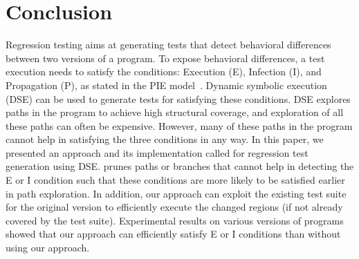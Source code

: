 \section{Conclusion}
\label{sec:conclusion}
Regression testing aims at generating tests that detect behavioral differences between two versions of a program. To expose behavioral differences, a test execution needs to satisfy the conditions: Execution (E), Infection (I), and Propagation (P), as stated in the PIE model~\cite{voas}. Dynamic symbolic execution (DSE) can be used to generate tests for satisfying these conditions. DSE explores paths in the program to achieve high structural coverage, and exploration of all these paths can often be expensive. However, many of these paths in the program cannot help in satisfying the three conditions in any way. In this paper, we presented an approach and its implementation called  for regression test generation using DSE.  prunes paths or branches that cannot help in detecting the E or I condition such that these conditions are more likely to be satisfied earlier in path exploration. In addition, our approach can exploit the existing test suite for the original version to efficiently execute the changed regions (if not already covered by the test suite). 
Experimental results on various versions of programs showed that our approach can efficiently satisfy E or I conditions than without using our approach. 
